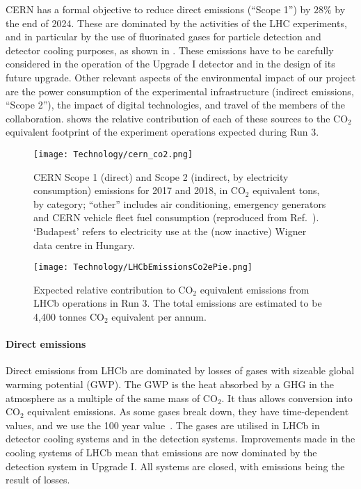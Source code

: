 \documentclass[../SustainableHEP.tex]{subfiles}
\begin{document}
\begin{casestudy}
CERN has a formal objective to reduce direct emissions (``Scope 1'') by $28\%$ by the end of 2024. These are dominated by the activities of the LHC experiments, and in particular by the use of fluorinated gases for particle detection and detector cooling purposes, as shown in . These emissions have to be carefully considered in the operation of the Upgrade I detector and in the design of its future upgrade. Other relevant aspects of the environmental impact of our project are the power consumption of the experimental infrastructure (indirect emissions, ``Scope 2''), the impact of digital technologies, and travel of the members of the collaboration.  shows the relative contribution of each of these sources to the CO$_2$ equivalent footprint of the experiment operations expected during Run 3. %

\begin{figure}
    \captionsetup{type=figure}
    {\texttt{[image: Technology/cern\_co2.png]}}
    \caption[CERN Scope 1 and Scope 2 emissions for 2017 and 2018]{CERN Scope 1 (direct) and Scope 2 (indirect, by electricity consumption) emissions for 2017 and 2018, in CO$_2$ equivalent tons, by category; ``other'' includes air conditioning, emergency generators and CERN vehicle fleet fuel consumption (reproduced from Ref.~\cite{envrep2020}).  `Budapest' refers to electricity use at the (now inactive) Wigner data centre in Hungary.}\label{fig:cern_co2}
\end{figure}

\begin{figure}
    \captionsetup{type=figure}
    {\texttt{[image: Technology/LHCbEmissionsCo2ePie.png]}}
    \caption[Expected relative emissions from LHCb operations in Run 3]{Expected relative contribution to CO$_2$ equivalent emissions from LHCb operations in Run 3. The total emissions are estimated to be 4,400 tonnes CO$_2$ equivalent per annum.}\label{fig:lhcb_co2}
\end{figure}

\paragraph{Direct emissions}

Direct emissions from LHCb are dominated by losses of gases with sizeable global warming potential (GWP). The GWP is the heat absorbed by a GHG in the atmosphere as a multiple of the same mass of CO$_2$.  It thus allows conversion into CO$_2$ equivalent emissions. As some gases break down, they have time-dependent values, and we use the 100 year value~\cite{AR5}. The gases are utilised in LHCb in detector cooling systems and in the detection systems. Improvements made in the cooling systems of LHCb mean that emissions are now dominated by the detection system in Upgrade I. All systems are closed, with emissions being the result of losses.


\end{casestudy}
\end{document}
